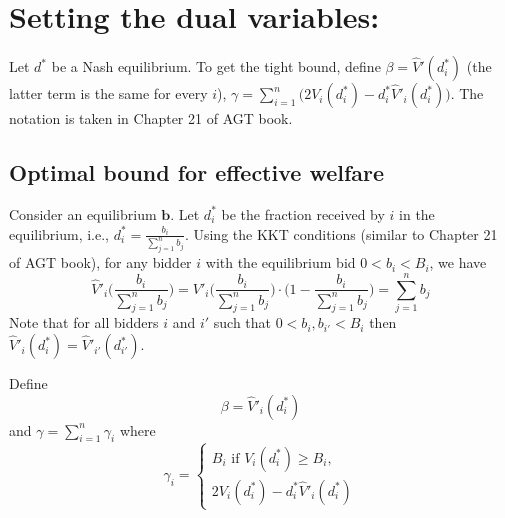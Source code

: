 \documentclass[11pt,a4paper]{article}
\newcommand{\vect}[1]{\ensuremath{\mathbf{#1}}}
\begin{document}
\section{Setting the dual variables:}

Let $d^{*}$ be a Nash equilibrium.
To get the tight bound, define $\beta = \hat{V}'(d^{*}_{i})$ (the latter term is the same for every $i$), $\gamma = \sum_{i=1}^{n} \bigl( 2V_i(d^{*}_{i}) - d^{*}_{i}\hat{V}'_i(d^{*}_{i}) \bigr)$.
The notation is taken in Chapter 21 of AGT book.

\subsection{Optimal bound for effective welfare}
Consider an equilibrium $\vect{b}$. Let $d_{i}^*$ be the fraction received by $i$ in the equilibrium, i.e., $d^{*}_{i} = \frac{b_{i}}{\sum_{j=1}^{n} b_{j}}$.
Using the KKT conditions (similar to Chapter 21 of AGT book), for any bidder $i$ with the equilibrium bid $0 < b_{i} < B_{i}$, we have
$$
\hat{V}'_{i}\biggl( \frac{b_{i}}{\sum_{j=1}^{n} b_{j}} \biggr)
= V'_{i}\biggl( \frac{b_{i}}{\sum_{j=1}^{n} b_{j}} \biggr) \cdot \biggl( 1 - \frac{b_{i}}{\sum_{j=1}^{n} b_{j}} \biggr)
= \sum_{j=1}^{n} b_{j}
$$
Note that for all bidders $i$ and $i'$ such that $0 < b_{i}, b_{i'} < B_{i}$ then
$ \hat{V}'_{i}(d^{*}_{i})  = \hat{V}'_{i'}(d_{i'}^*)$.

\clearpage
Define
$$
\beta = \hat{V}'_{i}(d^{*}_{i})
$$
and
$\gamma = \sum_{i=1}^{n} \gamma_{i}$
where
$$
\gamma_{i} = \begin{cases}
			B_{i} \text{ if } V_{i}(d^{*}_{i}) \geq B_{i}, \\
			2 V_{i}(d^{*}_{i}) -   d^{*}_{i} \hat{V}'_{i}(d^{*}_{i})
			\end{cases}
$$
\end{document}
